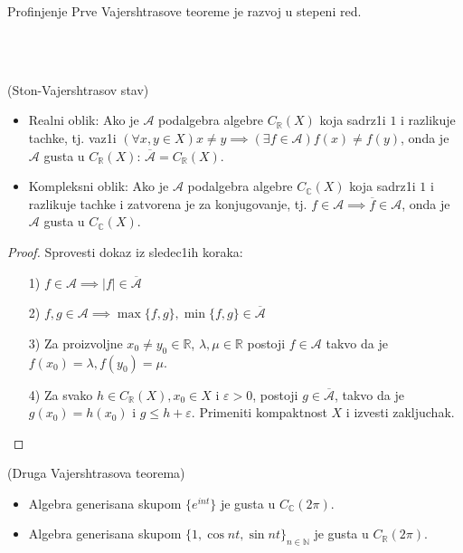 \documentclass[a4paper,12pt]{article}
\newcommand{\NN}{\mathbb{N}}
\newcommand{\RR}{\mathbb{R}}
\newcommand{\CC}{\mathbb{C}}
\newcommand{\eps}{\varepsilon}
\begin{document}
\begin{nap}
Profinjenje Prve Vajershtrasove teoreme je razvoj u stepeni red.
\end{nap}
\\ \\
\begin{tma}
(Ston-Vajershtrasov stav)
\begin{itemize}
\item Realni oblik: Ako je $\mathcal{A}$ podalgebra algebre $C_{\RR}(X)$ koja sadrz1i $1$ i razlikuje tachke, tj. vaz1i $(\forall x,y \in X) x \ne y \implies (\exists f \in \mathcal{A}) f(x) \ne f(y)$, onda je $\mathcal{A}$ gusta u $C_{\RR}(X)$: $\overline{\mathcal{A}} = C_{\RR}(X)$.
\item Kompleksni oblik: Ako je $\mathcal{A}$ podalgebra algebre $C_{\CC}(X)$ koja sadrz1i $1$ i razlikuje tachke i zatvorena je za kon\-jugovanje, tj. $f \in \mathcal{A} \implies \overline{f} \in \mathcal{A}$, onda je $\mathcal{A}$ gusta u $C_{\CC}(X)$.
\end{itemize}
\end{tma}
\begin{proof}
	Sprovesti dokaz iz sledec1ih koraka:
	\begin{itemize}
		\item[1)] $f \in \mathcal A \implies |f| \in \overline{\mathcal A}$ 
		\item[2)] $f, g \in \mathcal A \implies \max\{f, g\}, \min\{f, g\} \in \overline{\mathcal A}$
		\item[3)] Za proizvoljne $x_0\neq y_0 \in \RR$, $\lambda, \mu \in\RR$ postoji $f\in \mathcal A$
			takvo da je $f(x_0) = \lambda, f(y_0) = \mu$.
		\item[4)] Za svako $h\in C_\RR(X), x_0 \in X$ i $\eps > 0$, postoji $g\in\overline{\mathcal A}$, takvo da je 
			$g(x_0) = h(x_0)$ i $g \leq h+ \eps$. Primeniti kompaktnost $X$ i izvesti zakljuchak.
	\end{itemize}
\end{proof}
\begin{posl}
(Druga Vajershtrasova teorema)
\begin{itemize}
\item Algebra generisana skupom $\{e^{i n t}\}$ je gusta u $C_{\CC}(2 \pi)$.
\item  Algebra generisana skupom ${\{1, \cos nt, \sin nt \}}_{n \in \NN}$ je gusta u $C_{\RR}(2 \pi)$.
\end{itemize}
\end{posl}
\end{document}
